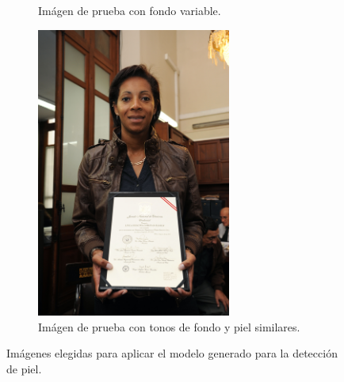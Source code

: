 \begin{figure}[ht!]
\begin{subfigure}[t]{0.4\textwidth}
        \caption{Imágen de prueba con fondo variable.}
        \label{fig:imágen_prueba_no6}
    \end{subfigure}
    \begin{subfigure}{0.4\textwidth}
        \centering
        \includegraphics[width=0.7\textwidth]{../figures/image2/image_02.png}
        \caption{Imágen de prueba con tonos de fondo y piel similares.}
        \label{fig:imágen_prueba_no2}
    \end{subfigure}
    \caption{Imágenes elegidas para aplicar el modelo generado para la detección de piel.}
\end{figure}

